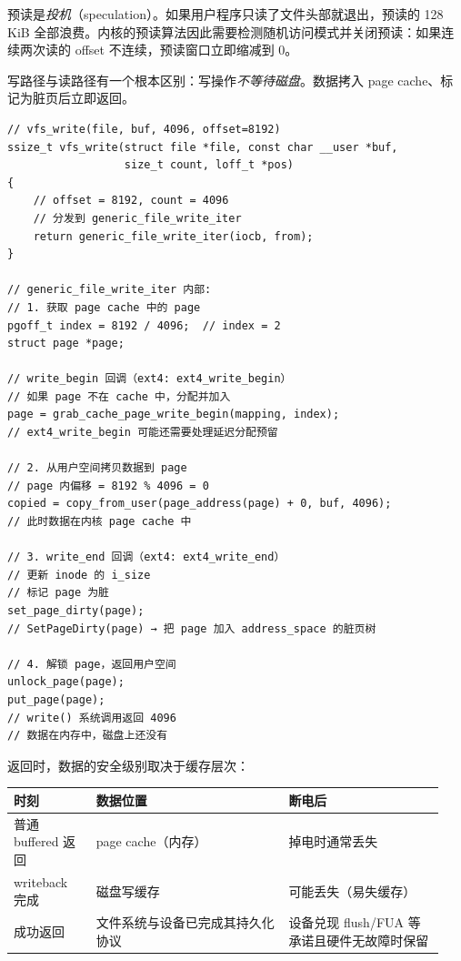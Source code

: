 \begin{filesystemlayout}
\begin{warningbox}
预读是\emph{投机}（speculation）。如果用户程序只读了文件头部就退出，预读的 128 KiB 全部浪费。内核的预读算法因此需要检测随机访问模式并关闭预读：如果连续两次读的 offset 不连续，预读窗口立即缩减到 0。
\end{warningbox}


写路径与读路径有一个根本区别：写操作\emph{不等待磁盘}。数据拷入 page cache、标记为脏页后立即返回。

\begin{lstlisting}
// vfs_write(file, buf, 4096, offset=8192)
ssize_t vfs_write(struct file *file, const char __user *buf,
                  size_t count, loff_t *pos)
{
    // offset = 8192, count = 4096
    // 分发到 generic_file_write_iter
    return generic_file_write_iter(iocb, from);
}

// generic_file_write_iter 内部:
// 1. 获取 page cache 中的 page
pgoff_t index = 8192 / 4096;  // index = 2
struct page *page;

// write_begin 回调（ext4: ext4_write_begin）
// 如果 page 不在 cache 中，分配并加入
page = grab_cache_page_write_begin(mapping, index);
// ext4_write_begin 可能还需要处理延迟分配预留

// 2. 从用户空间拷贝数据到 page
// page 内偏移 = 8192 % 4096 = 0
copied = copy_from_user(page_address(page) + 0, buf, 4096);
// 此时数据在内核 page cache 中

// 3. write_end 回调（ext4: ext4_write_end）
// 更新 inode 的 i_size
// 标记 page 为脏
set_page_dirty(page);
// SetPageDirty(page) → 把 page 加入 address_space 的脏页树

// 4. 解锁 page，返回用户空间
unlock_page(page);
put_page(page);
// write() 系统调用返回 4096
// 数据在内存中，磁盘上还没有
\end{lstlisting}

 返回时，数据的安全级别取决于缓存层次：

\begin{longtable}{|F{0.18\linewidth}|F{0.42\linewidth}|F{0.34\linewidth}|}
\toprule
{}
时刻 & 数据位置 & 断电后 \\
\midrule
普通 buffered  返回 & page cache（内存） & 掉电时通常丢失 \\\tablerowrule
writeback 完成 & 磁盘写缓存 & 可能丢失（易失缓存） \\\tablerowrule
{} 成功返回 & 文件系统与设备已完成其持久化协议 & 设备兑现 flush/FUA 等承诺且硬件无故障时保留 \\
\bottomrule
\end{longtable}


\end{filesystemlayout}
